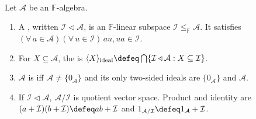 \begin{definition} \label{def:algebra-ideal-simple-quotient} \\
Let $\mathcal{A}$ be an $\mathbb{F}$-algebra.
\begin{enumerate}[label=(\roman*)]
\setlength{\itemsep}{0pt}
\item A , written $\mathcal{I}\triangleleft\mathcal{A}$, is an $\mathbb{F}$-linear subspace $\mathcal{I}\leq_{\mathbb{F}}\mathcal{A}$. It satisfies $(\forall\,a\in\mathcal{A})(\forall\,u\in\mathcal{I})\,au,ua\in\mathcal{I}$.
\item For $X\subseteq\mathcal{A}$, the  is $\langle X\rangle_{\operatorname{ideal}}\defeq\bigcap\limits\{\mathcal{I}\triangleleft\mathcal{A}:X\subseteq\mathcal{I}\}$.
\item $\mathcal{A}$ is  iff $\mathcal{A}\neq\{0_{\mathcal{A}}\}$ and its only two-sided ideals are $\{0_{\mathcal{A}}\}$ and $\mathcal{A}$.
\item If $\mathcal{I}\triangleleft\mathcal{A}$,  $\mathcal{A}/\mathcal{I}$ is quotient vector space. Product and identity are $(a+\mathcal{I})(b+\mathcal{I})\defeq ab+\mathcal{I}$ and $1_{\mathcal{A}/\mathcal{I}}\defeq1_{\mathcal{A}}+\mathcal{I}$.
\end{enumerate}
\end{definition}

